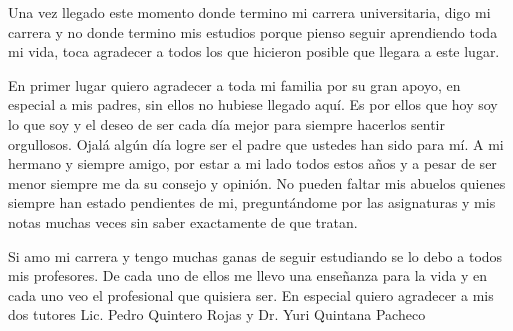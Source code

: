 \begin{acknowledgements}

Una vez llegado este momento donde termino mi carrera universitaria, digo mi carrera y no donde termino mis estudios porque pienso seguir aprendiendo toda mi vida, toca agradecer a todos los que hicieron posible que llegara a este lugar.

En primer lugar quiero agradecer a toda mi familia por su gran apoyo, en especial a mis padres, sin ellos no hubiese llegado aqu\'i. Es por ellos que hoy soy lo que soy y el deseo de ser cada d\'ia mejor para siempre hacerlos sentir orgullosos. Ojal\'a alg\'un d\'ia logre ser el padre que ustedes han sido para m\'i. A mi hermano y siempre amigo, por estar a mi lado todos estos a\~nos y a pesar de ser menor siempre me da su consejo y opini\'on. No pueden faltar mis abuelos quienes siempre han estado pendientes de mi, pregunt\'andome por las asignaturas y mis notas muchas veces sin saber exactamente de que tratan.

Si amo mi carrera y tengo muchas ganas de seguir estudiando se lo debo a todos mis profesores. De cada uno de ellos me llevo una ense\~nanza para la vida y en cada uno veo el profesional que quisiera ser. En especial quiero agradecer a mis dos tutores Lic. Pedro Quintero Rojas y Dr. Yuri Quintana Pacheco

\end{acknowledgements}